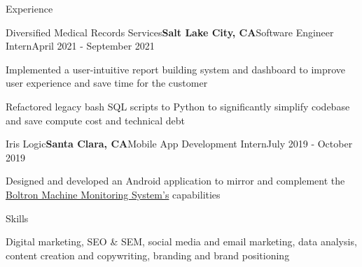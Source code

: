 \documentclass{resume}
\begin{document}
\begin{rSection}{\large Experience}
\begin{rSubsection}{Diversified Medical Records Services}{\bf{Salt Lake City, CA}}{Software Engineer Intern}{April 2021 - September 2021}
\item Implemented a user-intuitive report building system and dashboard to improve user experience and save time for the customer
\item Refactored legacy bash SQL scripts to Python to significantly simplify codebase and save compute cost and technical debt
\end{rSubsection}

\begin{rSubsection}{Iris Logic}{\bf{Santa Clara, CA}}{Mobile App Development Intern}{July 2019 - October 2019}
\item Designed and developed an Android application to mirror and complement the \href{https://irislogic.com/boltron-machine-monitoring-system/}{Boltron Machine Monitoring System's} capabilities
\end{rSubsection}
\end{rSection}


\begin{rSection}{\large Skills}

\begin{rSubsection}{}{}{}{}
\item Digital marketing, SEO & SEM, social media and email marketing, data analysis, content creation and copywriting, branding and brand positioning
\end{rSubsection}

\end{rSection}
\end{document}
